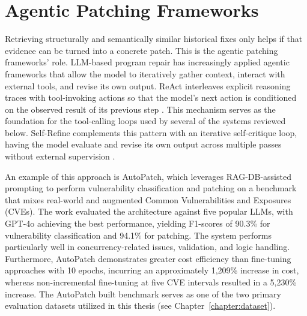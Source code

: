 \section{Agentic Patching Frameworks}

Retrieving structurally and semantically similar historical fixes only helps if that evidence can be turned into a concrete patch. 
This is the agentic patching frameworks' role. 
LLM-based program repair has increasingly applied agentic frameworks that allow the model to iteratively gather context, interact with external tools, and revise its own output. 
ReAct interleaves explicit reasoning traces with tool-invoking actions so that the model's next action is conditioned on the observed result of its previous step \cite{yao2023react}. 
This mechanism serves as the foundation for the tool-calling loops used by several of the systems reviewed below. 
Self-Refine complements this pattern with an iterative self-critique loop, having the model evaluate and revise its own output across multiple passes without external supervision \cite{madaan2023selfrefine}.

An example of this approach is AutoPatch, which leverages RAG-DB-assisted prompting to perform vulnerability classification and patching on a benchmark that mixes real-world and augmented Common Vulnerabilities and Exposures (CVEs).
The work evaluated the architecture against five popular LLMs, with GPT-4o achieving the best performance, yielding F1-scores of 90.3\% for vulnerability classification and 94.1\% for patching. 
The system performs particularly well in concurrency-related issues, validation, and logic handling. 
Furthermore, AutoPatch demonstrates greater cost efficiency than fine-tuning approaches with 10 epochs, incurring an approximately 1,209\% increase in cost, whereas non-incremental fine-tuning at five CVE intervals resulted in a 5,230\% increase. 
The AutoPatch built benchmark serves as one of the two primary evaluation datasets utilized in this thesis (see Chapter~\ref{chapter:dataset}). 

